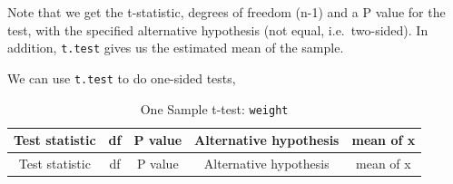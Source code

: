 \documentclass[]{book}
\newenvironment{Shaded}{\begin{snugshade}}{\end{snugshade}}
\newcommand{\DataTypeTok}[1]{\textcolor[rgb]{0.13,0.29,0.53}{#1}}
\newcommand{\FloatTok}[1]{\textcolor[rgb]{0.00,0.00,0.81}{#1}}
\newcommand{\KeywordTok}[1]{\textcolor[rgb]{0.13,0.29,0.53}{\textbf{#1}}}
\newcommand{\NormalTok}[1]{#1}
\newcommand{\OperatorTok}[1]{\textcolor[rgb]{0.81,0.36,0.00}{\textbf{#1}}}
\newcommand{\StringTok}[1]{\textcolor[rgb]{0.31,0.60,0.02}{#1}}
\begin{document}
Note that we get the t-statistic, degrees of freedom (n-1) and a P value for the test, with the specified alternative hypothesis (not equal, i.e.~two-sided). In addition, \texttt{t.test} gives us the estimated mean of the sample.

We can use \texttt{t.test} to do one-sided tests,

\begin{Shaded}
\end{Shaded}

\begin{longtable}[]{@{}ccccc@{}}
\caption{One Sample t-test: \texttt{weight}}\tabularnewline
\toprule
\begin{minipage}[b]{0.20\columnwidth}\centering
Test statistic\strut
\end{minipage} & \begin{minipage}[b]{0.06\columnwidth}\centering
df\strut
\end{minipage} & \begin{minipage}[b]{0.16\columnwidth}\centering
P value\strut
\end{minipage} & \begin{minipage}[b]{0.29\columnwidth}\centering
Alternative hypothesis\strut
\end{minipage} & \begin{minipage}[b]{0.14\columnwidth}\centering
mean of x\strut
\end{minipage}\tabularnewline
\midrule
\endfirsthead
\toprule
\begin{minipage}[b]{0.20\columnwidth}\centering
Test statistic\strut
\end{minipage} & \begin{minipage}[b]{0.06\columnwidth}\centering
df\strut
\end{minipage} & \begin{minipage}[b]{0.16\columnwidth}\centering
P value\strut
\end{minipage} & \begin{minipage}[b]{0.29\columnwidth}\centering
Alternative hypothesis\strut
\end{minipage} & \begin{minipage}[b]{0.14\columnwidth}\centering
mean of x\strut
\end{minipage}\tabularnewline

\end{longtable}
\end{document}
